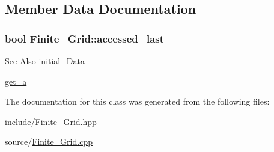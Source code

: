 \subsection{Member Data Documentation}
\hypertarget{classFinite__Grid_a08a42cb21b0c78b53ee9585f35d94fa5}{
\subsubsection[{accessed\-\_\-last}]{\setlength{\rightskip}{0pt plus 5cm}bool Finite\-\_\-\-Grid\-::accessed\-\_\-last}}\label{classFinite__Grid_a08a42cb21b0c78b53ee9585f35d94fa5}
\begin{DoxySeeAlso}{See Also}
\hyperlink{classFinite__Grid_af682ebd228fc0e5b4f22f550925c37f1}{initial\-\_\-\-Data} 

\hyperlink{classFinite__Grid_aa7592683c6e4209bf963b3d86592ea70}{get\-\_\-a} 
\end{DoxySeeAlso}


The documentation for this class was generated from the following files\-:\begin{DoxyCompactItemize}
\item 
include/\hyperlink{Finite__Grid_8hpp}{Finite\-\_\-\-Grid.\-hpp}\item 
source/\hyperlink{Finite__Grid_8cpp}{Finite\-\_\-\-Grid.\-cpp}\end{DoxyCompactItemize}
